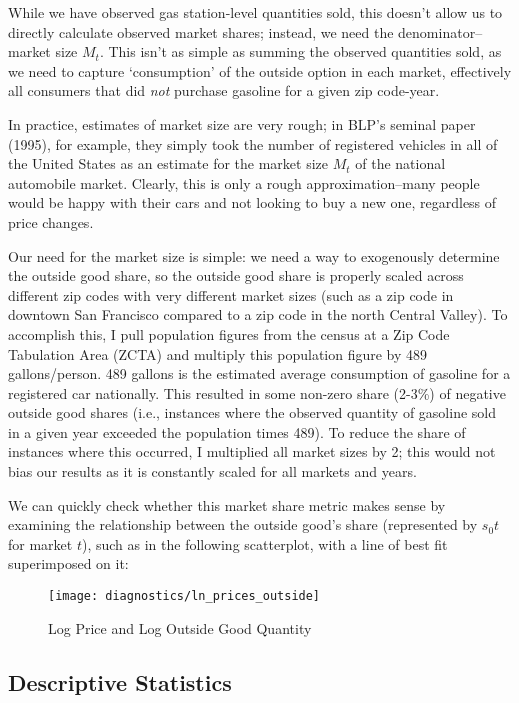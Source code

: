 \documentclass{article}
\begin{document}
While we have observed gas station-level quantities sold, this doesn't allow us to directly calculate observed market shares; instead, we need the denominator--market size $M_t$. This isn't as simple as summing the observed quantities sold, as we need to capture `consumption' of the outside option in each market, effectively all consumers that did \textit{not} purchase gasoline for a given zip code-year. 

In practice, estimates of market size are very rough; in BLP's seminal paper (1995), for example, they simply took the number of registered vehicles in all of the United States as an estimate for the market size $M_t$ of the national automobile market. Clearly, this is only a rough approximation--many people would be happy with their cars and not looking to buy a new one, regardless of price changes. 

Our need for the market size is simple: we need a way to exogenously determine the outside good share, so the outside good share is properly scaled across different zip codes with very different market sizes (such as a zip code in downtown San Francisco compared to a zip code in the north Central Valley). To accomplish this, I pull population figures from the census at a Zip Code Tabulation Area (ZCTA) and multiply this population figure by 489 gallons/person. 489 gallons is the estimated average consumption of gasoline for a registered car nationally. This resulted in some non-zero share (2-3\%) of negative outside good shares (i.e., instances where the observed quantity of gasoline sold in a given year exceeded the population times 489). To reduce the share of instances where this occurred, I multiplied all market sizes by 2; this would not bias our results as it is constantly scaled for all markets and years.

We can quickly check whether this market share metric makes sense by examining the relationship between the outside good's share (represented by $s_0t$ for market $t$), such as in the following scatterplot, with a line of best fit superimposed on it:
\begin{figure}[H]
\centering
	\caption{Log Price and Log Outside Good Quantity}
		\texttt{[image: diagnostics/ln\_prices\_outside]}
\end{figure}

\subsection{Descriptive Statistics}
\end{document}
